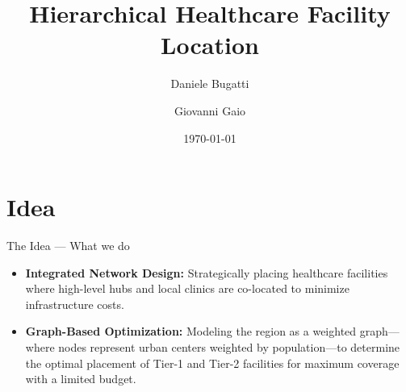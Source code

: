 \documentclass[11pt]{beamer}
\title[Hierarchical Healthcare Facility Location]{Hierarchical Healthcare Facility Location}
\author[Daniele Bugatti \& Giovanni Gaio]{Daniele Bugatti \and Giovanni Gaio}
\date{\today}
\begin{document}
\begin{frame}[plain]
  \titlepage
\end{frame}
\section{Idea}
\begin{frame}{The Idea --- What we do}
  \begin{itemize}
    \item \textbf{Integrated Network Design:} Strategically placing healthcare facilities where high-level hubs and local clinics are co-located to minimize infrastructure costs. 
    
    \item \textbf{Graph-Based Optimization:} Modeling the region as a weighted graph—where nodes represent urban centers weighted by population—to determine the optimal placement of Tier-1 and Tier-2 facilities for maximum coverage with a limited budget.

  \end{itemize}

  \vfill

  \begin{center}
  \end{center}
  \vfill
\end{frame}

\end{document}
